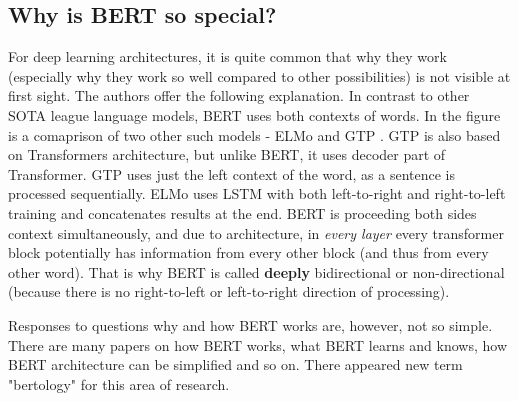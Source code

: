  \subsection{Why is BERT so special?}
 \label{sub:specialBert}
For deep learning architectures, it is quite common that why they work (especially why they work so well compared to other possibilities) is not visible at first sight. The authors offer the following explanation. In contrast to other SOTA league language models, BERT uses both contexts of words. In the figure %
is a comaprison of two other such models - ELMo and GTP %
. GTP is also based on Transformers architecture, but unlike BERT, it uses decoder part of Transformer. 
GTP uses just the left context of the word, as a sentence is processed sequentially. ELMo uses LSTM %
with both left-to-right and right-to-left training and concatenates results at the end. BERT is proceeding both sides context simultaneously, and due to architecture, in \textit{every layer} every transformer block potentially has information from every other block (and thus from every other word). That is why BERT is called \textbf{deeply} bidirectional or non-directional (because there is no right-to-left or left-to-right direction of processing).
\par
Responses to questions why and how BERT works are, however, not so simple. There are many papers on how BERT works, what BERT learns and knows, how BERT architecture can be simplified and so on. There appeared new term "bertology" for this area of research.
 


